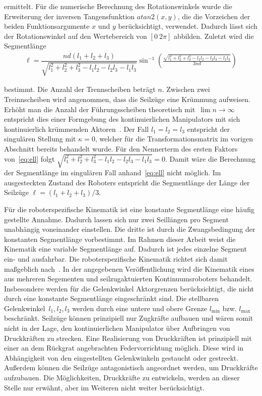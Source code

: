 ermittelt. Für die numerische Berechnung des Rotationswinkels wurde die Erweiterung der inversen Tangensfunktion $atan2(x, y)$, die die Vorzeichen der beiden Funktionsargumente $x$ und $y$ berücksichtigt, verwendet. Dadurch lässt sich der Rotationswinkel auf den Wertebereich von $[0~2\pi]$ abbilden. Zuletzt wird die Segmentlänge 
\begin{align}
\ell = \dfrac{nd(l_1+l_2+l_3)}{\sqrt{l_1^2+l_2^2+l_3^2-l_1l_2-l_2l_3-l_1l_3}} 
\sin^{-1}\left( \frac{\sqrt{l_1^2+l_2^2+l_3^2-l_1l_2-l_2l_3-l_1l_3}}{3nd} \right)
\label{eq:ell}
\end{align}

bestimmt. Die Anzahl der Trennscheiben beträgt $n$. Zwischen zwei Treinnscheiben wird angenommen, dass die Seilzüge eine Krümmung aufweisen. Erhöht man die Anzahl der Führungsscheiben theoretisch mit~$\lim n\to \infty$ entspricht dies einer Formgebung des kontinuierlichen Manipulators mit sich kontinuierlich krümmenden Aktoren~\cite{JW06}. Der Fall $l_1=l_2=l_3$ entspricht der singulären Stellung mit $\kappa = 0$, welcher für die Transformationsmatrix im vorigen Abschnitt bereits behandelt wurde. Für den Nennerterm des ersten Faktors von~\eqref{eq:ell} folgt $\sqrt{l_1^2+l_2^2+l_3^2-l_1l_2-l_2l_3-l_1l_3} = 0$. Damit wäre die Berechnung der Segmentlänge im singulären Fall anhand~\eqref{eq:ell} nicht möglich. Im ausgesteckten Zustand des Roboters entspricht die Segmentlänge der Länge der Seilzüge \mbox{$\ell= (l_1+l_2+l_3)/3$}.


Für die roboterspezifische Kinematik ist eine konstante Segmentlänge eine häufig gestellte Annahme. Dadurch lassen sich nur zwei Seillängen pro Segment unabhängig voneinander einstellen. Die dritte ist durch die Zwangsbedingung der konstanten Segmentlänge vorbestimmt. 
Im Rahmen dieser Arbeit weist die Kinematik eine variable Segmentlänge auf. Dadurch ist jedes einzelne Segment ein- und ausfahrbar. Die roboterspezifische Kinematik richtet sich damit maßgeblich nach~\cite{JW06a}. In der angegebenen Veröffentlichung wird die Kinematik eines aus mehreren Segementen und seilzugaktuierten Kontinuumsroboters behandelt. Insbesondere werden für die Gelenkwinkel Aktorgrenzen berücksichtigt, die nicht durch eine konstante Segmentlänge eingeschränkt sind. Die stellbaren \mbox{Gelenkwinkel $l_1, l_2, l_3$} werden durch eine untere und obere Grenze $l_{\mathrm{min}}$ bzw. $l_{\mathrm{max}}$ beschränkt. Seilzüge können prinzipiell nur Zugkräfte aufbauen und wären somit nicht in der Lage, den kontinuierlichen Manipulator über Aufbringen von Druckkräften zu strecken. Eine Realisierung von Druckkräften ist prinzipiell mit einer an dem Rückgrat angebrachten Federvorrichtung möglich. Diese wird in Abhängigkeit von den eingestellten Gelenkwinkeln gestaucht oder gestreckt. Außerdem können die Seilzüge antagonistisch angeordnet werden, um Druckkräfte aufzubauen. Die Möglichkeiten, Druckkräfte zu entwickeln, werden an dieser Stelle nur erwähnt, aber im Weiteren nicht weiter berücksichtigt. \newline


